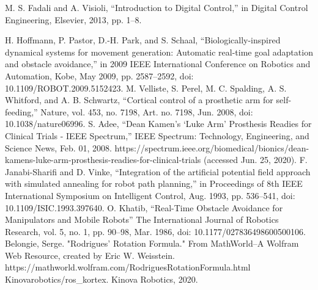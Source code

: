 \documentclass[a4paper, 10pt, conference]{ieeeconf}      %
\begin{document}


\begin{thebibliography}{99}

 M. S. Fadali and A. Visioli, “Introduction to Digital Control,” in Digital Control Engineering, Elsevier, 2013, pp. 1–8.


 H. Hoffmann, P. Pastor, D.-H. Park, and S. Schaal, “Biologically-inspired dynamical systems for movement generation: Automatic real-time goal adaptation and obstacle avoidance,” in 2009 IEEE International Conference on Robotics and Automation, Kobe, May 2009, pp. 2587–2592, doi: 10.1109/ROBOT.2009.5152423.
 M. Velliste, S. Perel, M. C. Spalding, A. S. Whitford, and A. B. Schwartz, “Cortical control of a prosthetic arm for self-feeding,” Nature, vol. 453, no. 7198, Art. no. 7198, Jun. 2008, doi: 10.1038/nature06996.
 S. Adee, “Dean Kamen’s ‘Luke Arm’ Prosthesis Readies for Clinical Trials - IEEE Spectrum,” IEEE Spectrum: Technology, Engineering, and Science News, Feb. 01, 2008. https://spectrum.ieee.org/biomedical/bionics/dean-kamens-luke-arm-prosthesis-readies-for-clinical-trials (accessed Jun. 25, 2020).
 F. Janabi-Sharifi and D. Vinke, “Integration of the artificial potential field approach with simulated annealing for robot path planning,” in Proceedings of 8th IEEE International Symposium on Intelligent Control, Aug. 1993, pp. 536–541, doi: 10.1109/ISIC.1993.397640.
 O. Khatib, “Real-Time Obstacle Avoidance for Manipulators and Mobile Robots” The International Journal of Robotics Research, vol. 5, no. 1, pp. 90–98, Mar. 1986, doi: 10.1177/027836498600500106.
  Belongie, Serge. "Rodrigues' Rotation Formula." From MathWorld--A Wolfram Web Resource, created by Eric W. Weisstein. https://mathworld.wolfram.com/RodriguesRotationFormula.html 
 Kinovarobotics/ros\_kortex. Kinova Robotics, 2020.



\end{thebibliography}
\end{document}
